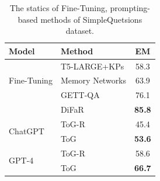 \documentclass{article} %
\begin{document}
\begin{table}[]
\centering
\begin{tabular}{llc}
\hline
       \textbf{Model}    & \textbf{Method} &  \textbf{EM} \\ \hline
\multirow{3}{*}{Fine-Tuning}     
&  T5-LARGE+KPs \citep{santos2022knowledge} & 58.3	\\
&  Memory Networks
 \citep{simple_questions_dataset}	& 63.9 	
 
   \\  %
   &  GETT-QA \citep{banerjee2023gettqa}	& 76.1	\\
  & DiFaR\citep{simple_questions1}	& \textbf{85.8}	\\ \hline
\multirow{2}{*}{ChatGPT}          
                                 &  ToG-R                     &  45.4  \\
                                 &  ToG                 & \textbf{53.6}   \\ \hline
\multirow{2}{*}{GPT-4}                            &  ToG-R                     &  58.6  \\
                                 &  ToG                 & \textbf{66.7}   \\ \hline
\end{tabular}

\caption{The statics of Fine-Tuning, prompting-based methods of SimpleQuetsions dataset.}
\label{tab: simpleqa}
\end{table}
\end{document}
